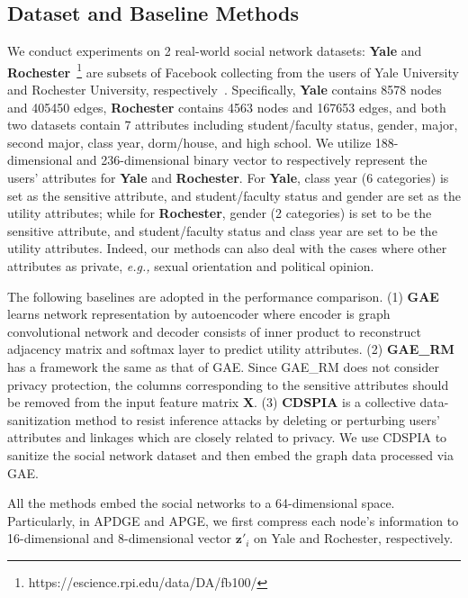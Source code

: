 \documentclass{article}
\begin{document}
\subsection{Dataset and Baseline Methods}
We conduct experiments on 2 real-world social network datasets:
\textbf{Yale} and \textbf{Rochester}~\footnote{https://escience.rpi.edu/data/DA/fb100/} are subsets of Facebook collecting from the users of Yale University and Rochester University, respectively~\citep{traud2012social}. Specifically, \textbf{Yale} contains 8578 nodes and 405450 edges, \textbf{Rochester} contains 4563 nodes and 167653 edges, and both two datasets contain 7 attributes including student/faculty status, gender, major, second major, class year, dorm/house, and high school. We utilize 188-dimensional and 236-dimensional binary vector to respectively represent the users' attributes for \textbf{Yale} and \textbf{Rochester}. For \textbf{Yale}, class year (6 categories) is set as the sensitive attribute, and student/faculty status and gender are set as the utility attributes; while for \textbf{Rochester}, gender (2 categories) is set to be the sensitive attribute, and student/faculty status and class year are set to be the utility attributes. Indeed, our methods can also deal with the cases where other attributes as private, {\em e.g.,} sexual orientation and political opinion.%


The following baselines are adopted in the performance comparison.
(1) \textbf{GAE} \citep{kipf2016variational} learns network representation by autoencoder where encoder is graph convolutional network and decoder consists of inner product to reconstruct adjacency matrix and softmax layer to predict utility attributes.
(2) \textbf{GAE\_RM} \citep{kipf2016variational} has a framework the same as that of GAE. Since GAE\_RM does not consider privacy protection, the columns corresponding to the sensitive attributes should be removed from the input feature matrix $\mathbf{X}$.
(3) \textbf{CDSPIA} \citep{cai2018collective} is a collective data-sanitization method to resist inference attacks by deleting or perturbing users' attributes and linkages which are closely related to privacy. We use CDSPIA to sanitize the social network dataset and then embed the graph data processed via GAE.


All the methods embed the social networks to a 64-dimensional space. Particularly, in APDGE and APGE, we first compress each node's information to 16-dimensional and 8-dimensional vector $\mathbf{z}'_i$ on Yale and Rochester, respectively.
\end{document}
